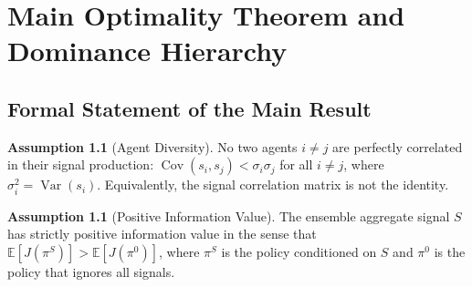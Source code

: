 \documentclass[12pt,openany]{book}
\newcommand{\E}{\mathbb{E}}
\numberwithin{equation}{chapter}
\theoremstyle{plain}
\theoremstyle{definition}
\newtheorem{assumption}[theorem]{Assumption}
\theoremstyle{remark}
\numberwithin{equation}{chapter}
\theoremstyle{plain}
\DeclareMathOperator{\Var}{Var}
\DeclareMathOperator{\Cov}{Cov}
\begin{document}
\chapter{Main Optimality Theorem and Dominance Hierarchy}
\label{ch:optimality}

\section{Formal Statement of the Main Result}

\begin{assumption}[Agent Diversity]
\label{asm:agent-diversity}
No two agents $i \neq j$ are perfectly correlated in their signal
production: $\Cov(s_i, s_j) < \sigma_i \sigma_j$ for all $i \neq j$,
where $\sigma_i^2 = \Var(s_i)$.  Equivalently, the signal correlation
matrix is not the identity.
\end{assumption}

\begin{assumption}[Positive Information Value]
\label{asm:info-value}
The ensemble aggregate signal $S$ has strictly positive information
value in the sense that $\E[J(\pi^S)] > \E[J(\pi^0)]$, where $\pi^S$
is the policy conditioned on $S$ and $\pi^0$ is the policy that
ignores all signals.
\end{assumption}
\end{document}
